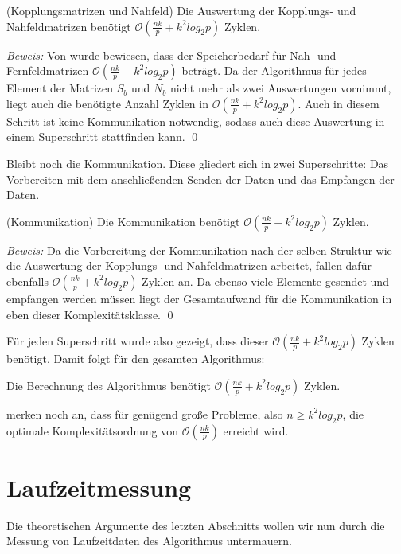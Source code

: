   \begin{lem}
  \label{lem:koppl}
    (Kopplungsmatrizen und Nahfeld)
    Die Auswertung der Kopplungs- und Nahfeldmatrizen benötigt $\mathcal{O}(\frac{nk}{p} + k^2 log_2p)$ Zyklen.
  \end{lem}

  \textit{Beweis:}
  Von \citet{distrh2} wurde bewiesen, dass der Speicherbedarf für Nah- und Fernfeldmatrizen $\mathcal{O}(\frac{nk}{p} + k^2 log_2p)$ beträgt. Da der Algorithmus für jedes Element der Matrizen $S_b$ und
  $N_b$ nicht mehr als zwei Auswertungen vornimmt, liegt auch die benötigte Anzahl Zyklen in $\mathcal{O}(\frac{nk}{p} + k^2 log_2p)$. Auch in diesem Schritt ist keine Kommunikation notwendig, sodass 
  auch diese Auswertung in einem Superschritt stattfinden kann. \qed
  
  Bleibt noch die Kommunikation. Diese gliedert sich in zwei Superschritte: Das Vorbereiten mit dem anschließenden Senden der Daten und das Empfangen der Daten. 
  
  \begin{lem}
    (Kommunikation)
    Die Kommunikation benötigt $\mathcal{O}(\frac{nk}{p} + k^2 log_2p)$ Zyklen.
  \end{lem}

  \textit{Beweis:}
  Da die Vorbereitung der Kommunikation nach der selben Struktur wie die Auswertung der Kopplungs- und Nahfeldmatrizen arbeitet, fallen dafür ebenfalls $\mathcal{O}(\frac{nk}{p} + k^2 log_2p)$ Zyklen 
  an. Da ebenso viele Elemente gesendet und empfangen werden müssen liegt der Gesamtaufwand für die Kommunikation in eben dieser Komplexitätsklasse. \qed
  
  Für jeden Superschritt wurde also gezeigt, dass dieser $\mathcal{O}(\frac{nk}{p} + k^2 log_2p)$ Zyklen benötigt. Damit folgt für den gesamten Algorithmus:
  
  \begin{thm}
    Die Berechnung des Algorithmus benötigt $\mathcal{O}(\frac{nk}{p} + k^2 log_2p)$ Zyklen.
  \end{thm}
  
  \citet{distrh2} merken noch an, dass  für genügend große Probleme, also $n \geq k^2 log_2p$, die optimale Komplexitätsordnung von $\mathcal{O}(\frac{nk}{p})$ erreicht wird.
  
  \section{Laufzeitmessung}
  \label{sec:lauf}
  Die theoretischen Argumente des letzten Abschnitts wollen wir nun durch die Messung von Laufzeitdaten des Algorithmus untermauern.
  
